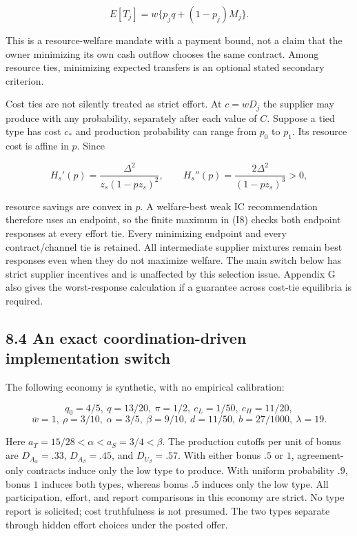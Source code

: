 \documentclass[
  11pt,
]{article}
\begin{document}
\[E[T_j]=w\{p_jq+(1-p_j)M_j\}. \tag{I10}\]

This is a resource-welfare mandate with a payment bound, not a claim
that the owner minimizing its own cash outflow chooses the same
contract. Among resource ties, minimizing expected transfers is an
optional stated secondary criterion.

Cost ties are not silently treated as strict effort. At \(c=wD_j\) the
supplier may produce with any probability, separately after each value
of \(C\). Suppose a tied type has cost \(c_*\) and production
probability can range from \(p_0\) to \(p_1\). Its resource cost is
affine in \(p\). Since

\[H_s'(p)=\frac{\Delta^2}{z_s(1-pz_s)^2},\qquad
H_s''(p)=\frac{2\Delta^2}{(1-pz_s)^3}>0, \tag{I11}\]

resource savings are convex in \(p\). A welfare-best weak IC
recommendation therefore uses an endpoint, so the finite maximum in (I8)
checks both endpoint responses at every effort tie. Every minimizing
endpoint and every contract/channel tie is retained. All intermediate
supplier mixtures remain best responses even when they do not maximize
welfare. The main switch below has strict supplier incentives and is
unaffected by this selection issue. Appendix G also gives the
worst-response calculation if a guarantee across cost-tie equilibria is
required.

\subsection{8.4 An exact coordination-driven implementation
switch}\label{an-exact-coordination-driven-implementation-switch}

The following economy is synthetic, with no empirical calibration:

\[q_0=4/5,\ q=13/20,\ \pi=1/2,\ c_L=1/50,\ c_H=11/20,\]
\[\bar w=1,\ \rho=3/10,\ \alpha=3/5,\ \beta=9/10,\ d=11/50,\ b=27/1000,\ \lambda=19. \tag{I12}\]

Here \(a_T=15/28<\alpha<a_S=3/4<\beta\). The production cutoffs per unit
of bonus are \(D_{A_\alpha}=.33\), \(D_{A_\beta}=.45\), and
\(D_{U_\beta}=.57\). With either bonus \(.5\) or \(1\), agreement-only
contracts induce only the low type to produce. With uniform probability
\(.9\), bonus \(1\) induces both types, whereas bonus \(.5\) induces
only the low type. All participation, effort, and report comparisons in
this economy are strict. No type report is solicited; cost truthfulness
is not presumed. The two types separate through hidden effort choices
under the posted offer.
\end{document}
